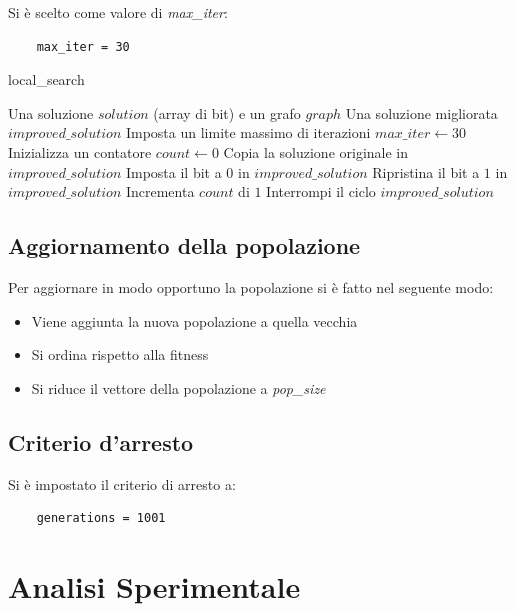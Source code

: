 \documentclass[a4paper,12pt]{article}
\begin{document}
Si è scelto come valore di \textit{max\_iter}:
\begin{verbatim}
    max_iter = 30
\end{verbatim}
\begin{algorithm}[H]
\caption{local\_search}
\begin{algorithmic}[1]
\Require Una soluzione $\mathit{solution}$ (array di bit) e un grafo $\mathit{graph}$
\Ensure Una soluzione migliorata $\mathit{improved\_solution}$
\State Imposta un limite massimo di iterazioni $\mathit{max\_iter} \gets 30$
\State Inizializza un contatore $\mathit{count} \gets 0$
\State Copia la soluzione originale in $\mathit{improved\_solution}$
        \State Imposta il bit a $0$ in $\mathit{improved\_solution}$
            \State Ripristina il bit a $1$ in $\mathit{improved\_solution}$
        \EndIf
    \EndIf
    \State Incrementa $\mathit{count}$ di $1$
        \State Interrompi il ciclo
    \EndIf
\EndFor
\State \Return $\mathit{improved\_solution}$
\end{algorithmic}
\end{algorithm}

\subsection{Aggiornamento della popolazione}
Per aggiornare in modo opportuno la popolazione si è fatto nel seguente modo:
\begin{itemize}
    \item Viene aggiunta la nuova popolazione a quella vecchia
    \item Si ordina rispetto alla fitness
    \item Si riduce il vettore della popolazione a \textit{pop\_size}
\end{itemize}

\subsection{Criterio d'arresto}
Si è impostato il criterio di arresto a:
\begin{verbatim}
    generations = 1001
\end{verbatim}

\section{Analisi Sperimentale}
\end{document}

